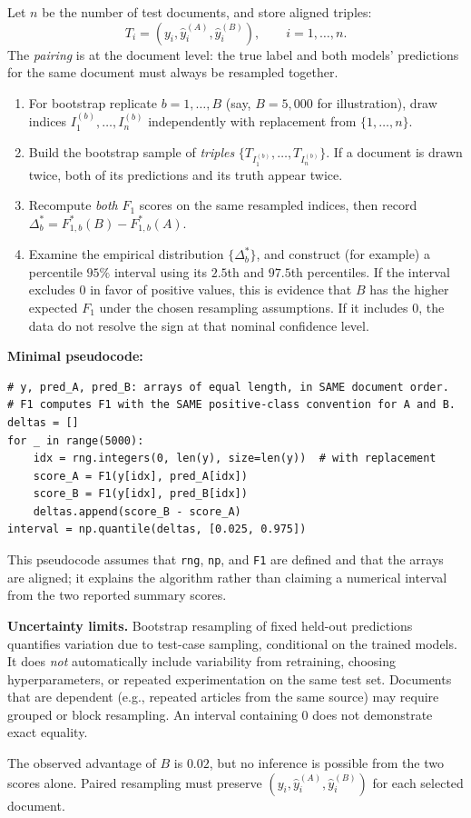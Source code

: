 Let $n$ be the number of test documents, and store aligned triples:
\[
T_i=(y_i,\hat y_i^{(A)},\hat y_i^{(B)}),\qquad i=1,\dots,n.
\]
The \emph{pairing} is at the document level: the true label and both models' predictions for the same document must always be resampled together.

\begin{enumerate}[label=\textbf{Step \arabic*.}]
\item For bootstrap replicate $b=1,\dots,B$ (say, $B=5{,}000$ for illustration), draw indices $I_1^{(b)},\dots,I_n^{(b)}$ independently with replacement from $\{1,\dots,n\}$.
\item Build the bootstrap sample of \emph{triples} $\big\{T_{I_1^{(b)}},\dots,T_{I_n^{(b)}}\big\}$. If a document is drawn twice, both of its predictions and its truth appear twice.
\item Recompute \emph{both} $F_1$ scores on the same resampled indices, then record $\Delta_b^*=F_{1,b}^*(B)-F_{1,b}^*(A)$.
\item Examine the empirical distribution $\{\Delta_b^*\}$, and construct (for example) a percentile $95\%$ interval using its $2.5$th and $97.5$th percentiles. If the interval excludes $0$ in favor of positive values, this is evidence that $B$ has the higher expected $F_1$ under the chosen resampling assumptions. If it includes $0$, the data do not resolve the sign at that nominal confidence level.
\end{enumerate}

\textbf{Minimal pseudocode:}
\begin{lstlisting}
# y, pred_A, pred_B: arrays of equal length, in SAME document order.
# F1 computes F1 with the SAME positive-class convention for A and B.
deltas = []
for _ in range(5000):
    idx = rng.integers(0, len(y), size=len(y))  # with replacement
    score_A = F1(y[idx], pred_A[idx])
    score_B = F1(y[idx], pred_B[idx])
    deltas.append(score_B - score_A)
interval = np.quantile(deltas, [0.025, 0.975])
\end{lstlisting}
This pseudocode assumes that \texttt{rng}, \texttt{np}, and \texttt{F1} are defined and that the arrays are aligned; it explains the algorithm rather than claiming a numerical interval from the two reported summary scores.

\begin{important}
\textbf{Uncertainty limits.} Bootstrap resampling of fixed held-out predictions quantifies variation due to test-case sampling, conditional on the trained models. It does \emph{not} automatically include variability from retraining, choosing hyperparameters, or repeated experimentation on the same test set. Documents that are dependent (e.g., repeated articles from the same source) may require grouped or block resampling. An interval containing $0$ does not demonstrate exact equality.
\end{important}
\begin{answer}
The observed advantage of $B$ is $\boxed{0.02}$, but no inference is possible from the two scores alone. Paired resampling must preserve $(y_i,\hat y_i^{(A)},\hat y_i^{(B)})$ for each selected document.
\end{answer}

